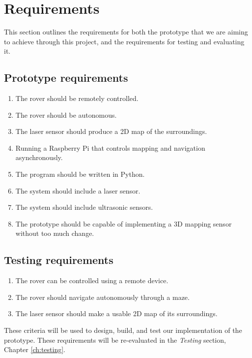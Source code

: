 \section{Requirements}

This section outlines the requirements for both the prototype that we are aiming to achieve through this project, and the requirements for testing and evaluating it.

\subsection{Prototype requirements}

\begin{enumerate}
	
	\item The rover should be remotely controlled.
	\item The rover should be autonomous.
	\item The laser sensor should produce a 2D map of the surroundings.
	\item Running a Raspberry Pi that controls mapping and navigation asynchronously.
	\item The program should be written in Python.
	\item The system should include a laser sensor.
	\item The system should include ultrasonic sensors.
 	\item The prototype should be capable of implementing a 3D mapping sensor without too much change.
	
\end{enumerate}

\subsection{Testing requirements}

\begin{enumerate}
	
	\item The rover can be controlled using a remote device.
	\item The rover should navigate autonomously through a maze.
	\item The laser sensor should make a usable 2D map of its surroundings.
	
\end{enumerate}

These criteria will be used to design, build, and test our implementation of the prototype. These requirements will be re-evaluated in the \textit{Testing} section, Chapter \ref{ch:testing}.
